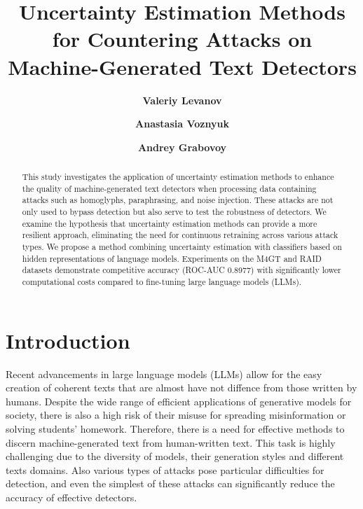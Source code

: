 \documentclass[a4paper, 12pt]{article}
\title{Uncertainty Estimation Methods for Countering Attacks on Machine-Generated Text Detectors}
\author[1]{\textbf{Valeriy Levanov}}
\author[1]{\textbf{Anastasia Voznyuk}}
\author[1]{\textbf{Andrey Grabovoy}}
\affil[1]{\texttt{Moscow Institute of Physics and Technology, Moscow}}
\begin{document}
\maketitle


\begin{abstract}
	This study investigates the application of uncertainty estimation methods to enhance the quality of machine-generated text detectors when processing data containing attacks such as homoglyphs, paraphrasing, and noise injection. These attacks are not only used to bypass detection but also serve to test the robustness of detectors. We examine the hypothesis that uncertainty estimation methods can provide a more resilient approach, eliminating the need for continuous retraining across various attack types. We propose a method combining uncertainty estimation with classifiers based on hidden representations of language models. Experiments on the M4GT and RAID datasets demonstrate competitive accuracy (ROC-AUC 0.8977) with significantly lower computational costs compared to fine-tuning large language models (LLMs).
\end{abstract}

\section{Introduction}
Recent advancements in large language models (LLMs) allow for the easy creation of coherent texts that are almost have not diffence from those written by humans. Despite the wide range of efficient applications of generative models for society, there is also a high risk of their misuse for spreading misinformation or solving students' homework. Therefore, there is a need for effective methods to discern machine-generated text from human-written text. This task is highly challenging due to the diversity of models, their generation styles and different texts domains. Also various types of attacks pose particular difficulties for detection, and even the simplest of these attacks can significantly reduce the accuracy of effective detectors.
\end{document}
